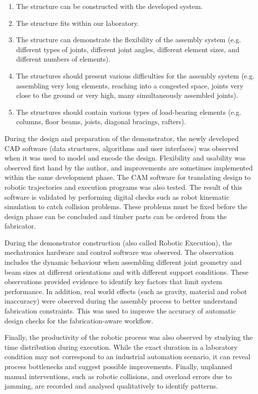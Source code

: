 \begin{enumerate}[nosep]
	\item The structure can be constructed with the developed system.
	\item The structure fits within our laboratory.
	\item The structure can demonstrate the flexibility of the assembly system (e.g. different types of joints, different joint angles, different element sizes, and different numbers of elements).
	\item The structures should present various difficulties for the assembly system (e.g. assembling very long elements, reaching into a congested space, joints very close to the ground or very high, many simultaneously assembled joints).
	\item The structures should contain various types of load-bearing elements (e.g. columns, floor beams, joists, diagonal bracings, rafters).

\end{enumerate}
During the design and preparation of the demonstrator, the newly developed CAD software (data structures, algorithms and user interfaces) was observed when it was used to model and encode the design. Flexibility and usability was observed first hand by the author, and improvements are sometimes implemented within the same development phase. The CAM software for translating design to robotic trajectories and execution programs was also tested. The result of this software is validated by performing digital checks such as robot kinematic simulation to catch collision problems. These problems must be fixed before the design phase can be concluded and timber parts can be ordered from the fabricator. 

During the demonstrator construction (also called Robotic Execution), the mechatronics hardware and control software was observed. The observation includes the dynamic behaviour when assembling different joint geometry and beam sizes at different orientations and with different support conditions. These observations provided evidence to identify key factors that limit system performance.  In addition, real world effects (such as gravity, material and robot inaccuracy) were observed during the assembly process to better understand fabrication constraints. This was used to improve the accuracy of automatic design checks for the fabrication-aware workflow.

Finally, the productivity of the robotic process was also observed by studying the time distribution during execution. While the exact duration in a laboratory condition may not correspond to an industrial automation scenario, it can reveal process bottlenecks and suggest possible improvements. Finally, unplanned manual interventions, such as robotic collisions, and overload errors due to jamming, are recorded and analysed qualitatively to identify patterns.

